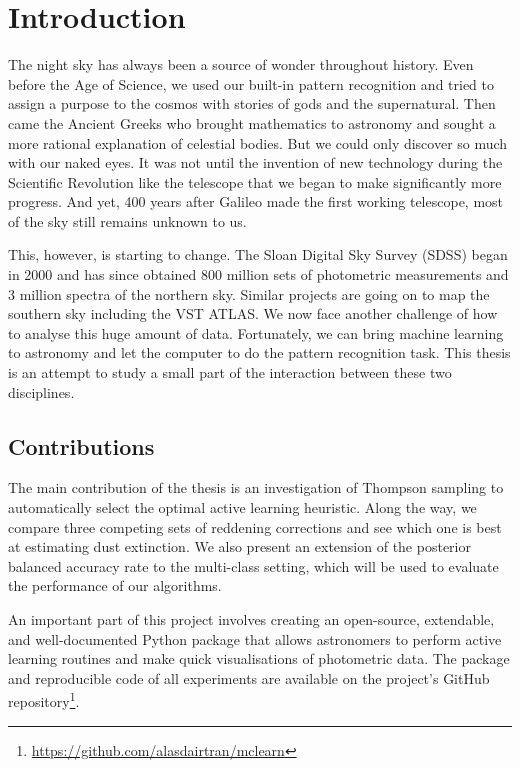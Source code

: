 
\chapter{Introduction}
\label{cha:intro}
The night sky has always been a source of wonder throughout history. Even before the Age of
Science, we used our built-in pattern recognition and tried to assign a purpose to
the cosmos with stories of gods and the supernatural. Then came the Ancient Greeks who brought
mathematics to astronomy and sought a more rational explanation of celestial bodies.
But we could only discover so much with our naked eyes. It was not until the invention
of new technology during the Scientific Revolution like the telescope that we began to
make significantly more progress. And yet, 400 years after Galileo made the first working
telescope, most of the sky still remains unknown to us.

This, however, is starting to change. The Sloan Digital Sky Survey (SDSS) began
in 2000 and has since obtained 800 million sets of photometric measurements
and 3 million spectra of the northern sky. Similar projects are going on
to map the southern sky including the VST ATLAS. We now face another challenge of how
to analyse this huge amount of data. Fortunately, we can bring machine learning
to astronomy and let the computer to do the pattern recognition task.
This thesis is an attempt to study a small part of the interaction between these
two disciplines.

\section{Contributions}
\label{sec:contributions}
The main contribution of the thesis is an investigation of Thompson sampling to automatically
select the optimal active learning heuristic. Along the way, we compare three competing sets
of reddening corrections and see which one is best at estimating dust extinction.
We also present an extension of the
posterior balanced accuracy rate to the multi-class setting, which will be used to evaluate
the performance of our algorithms.

An important part of this project involves creating an
open-source, extendable, and well-documented Python package that allows astronomers to perform active learning
routines and make quick visualisations of photometric data. The package and
reproducible code of all experiments are available on the project's GitHub repository\footnote{
	\url{https://github.com/alasdairtran/mclearn}}.


